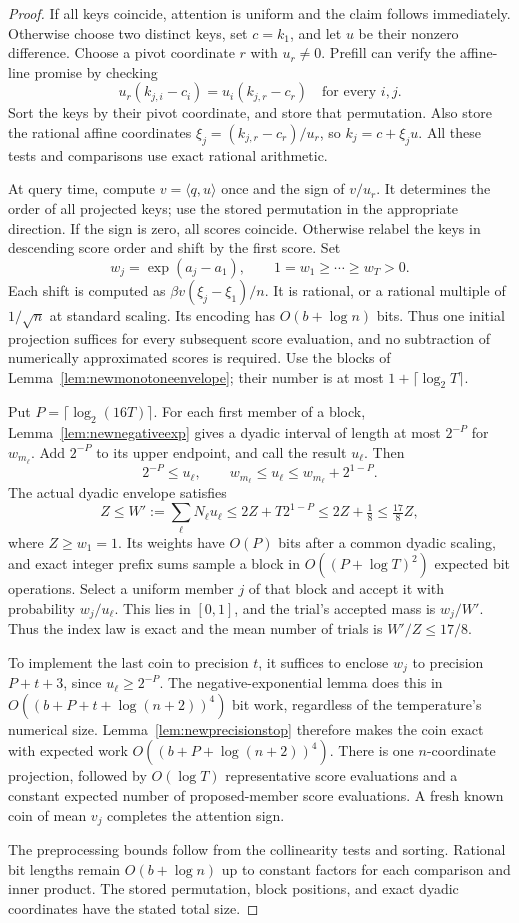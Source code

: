 \begin{proof}
If all keys coincide, attention is uniform and the claim follows
immediately. Otherwise choose two distinct keys, set $c=k_1$, and
let $u$ be their nonzero difference. Choose a pivot coordinate $r$
with $u_r\ne0$. Prefill can verify the affine-line promise by
checking
\[
 u_r(k_{j,i}-c_i)=u_i(k_{j,r}-c_r)
 \quad\text{for every }i,j.
\]
Sort the keys by their pivot coordinate, and store that permutation.
Also store the rational affine coordinates
$\xi_j=(k_{j,r}-c_r)/u_r$, so $k_j=c+\xi_ju$.
All these tests and comparisons use exact rational arithmetic.

At query time, compute $v=\langle q,u\rangle$ once and the sign of $v/u_r$.
It determines the order of all projected keys; use the stored
permutation in the appropriate direction. If the sign is zero,
all scores coincide. Otherwise relabel the keys in descending
score order and shift by the first score. Set
\[
 w_j=\exp(a_j-a_1),\qquad 1=w_1\ge\cdots\ge w_T>0.
\]
Each shift is computed as $\beta v(\xi_j-\xi_1)/n$.
It is rational, or a rational multiple of $1/\sqrt n$ at standard
scaling. Its encoding has $O(b+\log n)$ bits. Thus one initial
projection suffices for every subsequent score evaluation, and no
subtraction of numerically approximated scores is required.
Use the blocks of Lemma~\ref{lem:newmonotoneenvelope}; their number
is at most $1+\lceil\log_2T\rceil$.

Put $P=\lceil\log_2(16T)\rceil$. For each first member of a block,
Lemma~\ref{lem:newnegativeexp} gives a dyadic interval of length at
most $2^{-P}$ for $w_{m_\ell}$. Add $2^{-P}$ to its upper endpoint,
and call the result $u_\ell$. Then
\[
 2^{-P}\le u_\ell,
 \qquad w_{m_\ell}\le u_\ell\le w_{m_\ell}+2^{1-P}.
\]
The actual dyadic envelope satisfies
\[
 Z\le W':=\sum_\ell N_\ell u_\ell
 \le2Z+T2^{1-P}\le2Z+\tfrac18\le\tfrac{17}{8}Z,
\]
where $Z\ge w_1=1$. Its weights have $O(P)$ bits after a common
dyadic scaling, and exact integer prefix sums sample a block in
$O((P+\log T)^2)$ expected bit operations. Select a uniform member
$j$ of that block and accept it with probability $w_j/u_\ell$.
This lies in $[0,1]$, and the trial's accepted mass is $w_j/W'$.
Thus the index law is exact and the mean number of trials is
$W'/Z\le17/8$.

To implement the last coin to precision $t$, it suffices to enclose
$w_j$ to precision $P+t+3$, since $u_\ell\ge2^{-P}$.
The negative-exponential lemma does this in
$O((b+P+t+\log(n+2))^4)$ bit work, regardless of the temperature's
numerical size. Lemma~\ref{lem:newprecisionstop} therefore makes the
coin exact with expected work $O((b+P+\log(n+2))^4)$. There is one
$n$-coordinate projection, followed by $O(\log T)$ representative
score evaluations and a constant expected number of proposed-member
score evaluations. A fresh known
coin of mean $v_j$ completes the attention sign.

The preprocessing bounds follow from the collinearity tests and
sorting. Rational bit lengths remain $O(b+\log n)$ up to constant
factors for each comparison and inner product. The stored
permutation, block positions, and exact dyadic coordinates have
the stated total size.
\end{proof}

